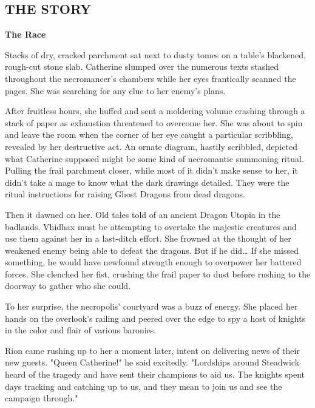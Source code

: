 \newpage

\begin{multicols*}{2}

\subsection*{\MakeUppercase{The story}}

\textbf{The Race}

Stacks of dry, cracked parchment sat next to dusty tomes on a table's blackened, rough-cut stone slab. Catherine slumped over the numerous texts stashed throughout the necromancer's chambers while her eyes frantically scanned the pages. She was searching for any clue to her enemy's plans.

After fruitless hours, she huffed and sent a moldering volume crashing through a stack of paper as exhaustion threatened to overcome her. She was about to spin and leave the room when the corner of her eye caught a particular scribbling, revealed by her destructive act. An ornate diagram, hastily scribbled, depicted what Catherine supposed might be some kind of necromantic summoning ritual. Pulling the frail parchment closer, while most of it didn't make sense to her, it didn't take a mage to know what the dark drawings detailed. They were the ritual instructions for raising Ghost Dragons from dead dragons.

Then it dawned on her. Old tales told of an ancient Dragon Utopia in the badlands. Vhidhax must be attempting to overtake the majestic creatures and use them against her in a last-ditch effort. She frowned at the thought of her weakened enemy being able to defeat the dragons. But if he did… If she missed something, he would have newfound strength enough to overpower her battered forces. She clenched her fist, crushing the frail paper to dust before rushing to the doorway to gather who she could.

To her surprise, the necropolis' courtyard was a buzz of energy. She placed her hands on the overlook's railing and peered over the edge to spy a host of knights in the color and flair of various baronies. 

Rion came rushing up to her a moment later, intent on delivering news of their new guests. "Queen Catherine!" he said excitedly. "Lordships around Steadwick heard of the tragedy and have sent their champions to aid us. The knights spent days tracking and catching up to us, and they mean to join us and see the campaign through."


\end{multicols*}
